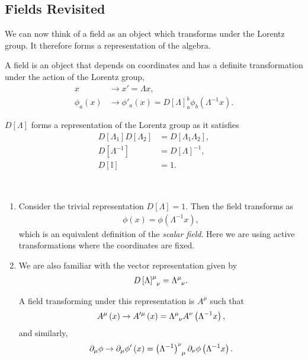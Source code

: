 \subsection{Fields Revisited}

We can now think of a field as an object which transforms under the Lorentz group. It therefore forms a representation of the algebra.

\begin{definition}
    A field is an object that depends on coordinates and has a definite transformation under the action of the Lorentz group,
    \begin{align}
        x & \to x' = \Lambda x, \\
        \phi_a \left( x \right) &\to \phi'_a \left( x \right) = D \left[ \Lambda \right]_{a}^{b} \phi_{b}\left( \Lambda^{-1} x \right) 
    .\end{align}
\end{definition}

$D \left[ \Lambda \right] $ forms a representation of the Lorentz group as it satisfies
\begin{align}
    D \left[ \Lambda_1 \right] D \left[ \Lambda_2 \right]  &= D \left[ \Lambda_1 \Lambda_2 \right], \\
    D \left[ \Lambda^{-1} \right] &= D \left[ \Lambda \right]^{-1}, \\
    D \left[ \mathbb{I} \right]  &= 1
.\end{align}

\begin{examples}~
    \begin{enumerate}[label=\arabic*)]
        \item Consider the trivial representation $D \left[ \Lambda \right] = 1$. Then the field transforms as
\begin{align}
    \phi \left( x \right) = \phi \left( \Lambda^{-1} x \right) 
,\end{align}
which is an equivalent definition of the \textit{scalar field}. Here we are using active transformations where the coordinates are fixed.

    \item We are also familiar with the vector representation given by
        \begin{align}
            \tensor{D \left[ \Lambda \right] }{^{\mu}_{\nu}} = \tensor{\Lambda}{^{\mu}_{\nu}}
        .\end{align}

        A field transforming under this representation is $A^{\mu}$ such that
        \begin{align}
            A^{\mu}\left( x \right) \to A'^{\mu}\left( x \right)  = \tensor{\Lambda}{^{\mu}_{\nu}} A^{\nu} \left( \Lambda^{-1} x \right) 
        ,\end{align}
        and similarly,
        \begin{align}
            \partial_\mu \phi \to \partial_\mu \phi' \left( x \right) = \tensor{\left( \Lambda^{-1} \right)}{^{\nu}_\mu} \partial_\nu \phi \left( \Lambda^{-1} x \right) 
        .\end{align}
    \end{enumerate}
\end{examples}

